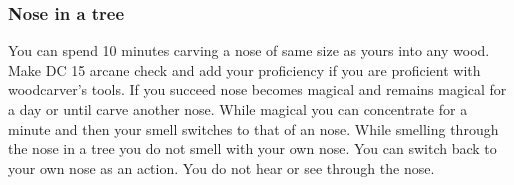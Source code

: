 \subsubsection{Nose in a tree}

You can spend 10 minutes carving a nose of same size as yours into any wood. Make DC 15 arcane check and add your proficiency if you are proficient with woodcarver's tools. If you succeed nose becomes magical and remains magical for a day or until carve another nose. While magical you can concentrate for a minute and then your smell switches to that of an nose. While smelling through the nose in a tree you do not smell with your own nose. You can switch back to your own nose as an action. You do not hear or see through the nose.
